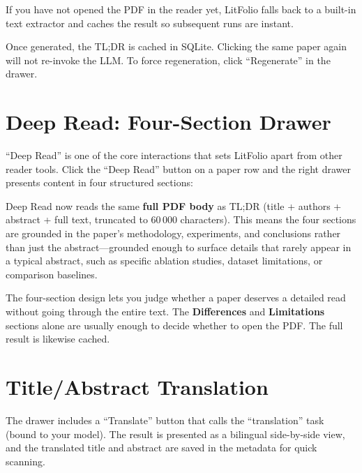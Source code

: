 If you have not opened the PDF in the reader yet, LitFolio falls back to a built-in
text extractor and caches the result so subsequent runs are instant.

\begin{tipbox}
Once generated, the TL;DR is cached in SQLite. Clicking the same paper again will not
re-invoke the LLM. To force regeneration, click ``Regenerate'' in the drawer.
\end{tipbox}

\section{Deep Read: Four-Section Drawer}

``Deep Read'' is one of the core interactions that sets LitFolio apart from other
reader tools. Click the ``Deep Read'' button on a paper row and the right drawer
presents content in four structured sections:


Deep Read now reads the same \textbf{full PDF body} as TL;DR (title + authors +
abstract + full text, truncated to 60\,000 characters). This means the four sections
are grounded in the paper's methodology, experiments, and conclusions rather than just
the abstract---grounded enough to surface details that rarely appear in a typical
abstract, such as specific ablation studies, dataset limitations, or comparison baselines.

The four-section design lets you judge whether a paper deserves a detailed read
without going through the entire text. The \textbf{Differences} and \textbf{Limitations}
sections alone are usually enough to decide whether to open the PDF. The full result
is likewise cached.

\section{Title/Abstract Translation}

The drawer includes a ``Translate'' button that calls the ``translation'' task (bound
to your  model). The result is presented as a bilingual side-by-side
view, and the translated title and abstract are saved in the metadata for quick
scanning.

